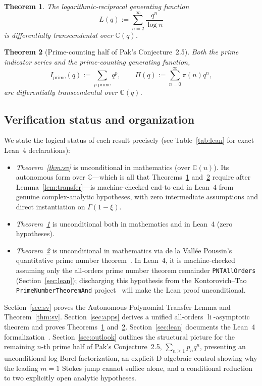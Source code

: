 \documentclass[10pt,reqno]{amsart}
\numberwithin{equation}{section}
\newtheorem{theorem}{Theorem}
\theoremstyle{definition}
\newcommand{\C}{\mathbb{C}}
\DeclareMathOperator{\li}{li}
\begin{document}
\begin{theorem}\label{thm:log-recip}
The logarithmic-reciprocal generating function
\[
  L(q) := \sum_{n=2}^\infty \frac{q^n}{\log n}
\]
is differentially transcendental over $\C(q)$.
\end{theorem}

\begin{theorem}[Prime-counting half of Pak's Conjecture~2.5]\label{thm:primes}
Both the prime indicator series and the prime-counting generating function,
\[
  I_{\mathrm{prime}}(q) := \sum_{p\text{ prime}} q^p, \qquad
  \Pi(q) := \sum_{n=0}^\infty \pi(n) q^n,
\]
are differentially transcendental over $\C(q)$.
\end{theorem}

\subsection*{Verification status and organization}
We state the logical status of each result precisely (see Table~\ref{tab:lean} for exact Lean~4 declarations):
\begin{itemize}
  \item \emph{Theorem~\ref{thm:sv}} is unconditional in mathematics (over $\C(u)$). Its autonomous form over $\C$---which is all that Theorems~\ref{thm:log-recip} and~\ref{thm:primes} require after Lemma~\ref{lem:transfer}---is machine-checked end-to-end in Lean~4 from genuine complex-analytic hypotheses, with zero intermediate assumptions and direct instantiation on $\Gamma(1-\xi)$.
  \item \emph{Theorem~\ref{thm:log-recip}} is unconditional both in mathematics and in Lean~4 (zero hypotheses).
  \item \emph{Theorem~\ref{thm:primes}} is unconditional in mathematics via de la Vall\'ee Poussin's quantitative prime number theorem~\cite{delaValleePoussin1899}. In Lean~4, it is machine-checked assuming only the all-orders prime number theorem remainder \texttt{PNTAllOrders} (Section~\ref{sec:lean}); discharging this hypothesis from the Kontorovich--Tao \texttt{PrimeNumberTheoremAnd} project~\cite{PrimeNumberTheoremAnd} will make the Lean proof unconditional.
\end{itemize}

Section~\ref{sec:sv} proves the Autonomous Polynomial Transfer Lemma and Theorem~\ref{thm:sv}. Section~\ref{sec:apps} derives a unified all-orders $\li$-asymptotic theorem and proves Theorems~\ref{thm:log-recip} and~\ref{thm:primes}. Section~\ref{sec:lean} documents the Lean~4 formalization~\cite{Helminen2026StokesVandermonde}. Section~\ref{sec:outlook} outlines the structural picture for the remaining $n$-th prime half of Pak's Conjecture~2.5, $\sum_{n \ge 1} p_n q^n$, presenting an unconditional log-Borel factorization, an explicit D-algebraic control showing why the leading $m=1$ Stokes jump cannot suffice alone, and a conditional reduction to two explicitly open analytic hypotheses.
\end{document}
